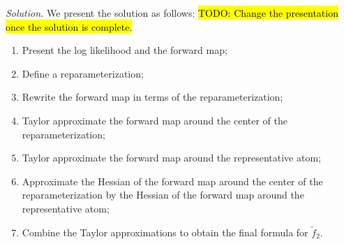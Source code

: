 \documentclass{homework}
\begin{document}
\textit{Solution.} 
We present the solution as follows: \hl{TODO: Change the presentation once the solution is complete.}
\begin{enumerate}
    \item Present the log likelihood and the forward map;
    \item Define a reparameterization;
    \item Rewrite the forward map in terms of the reparameterization;
    \item Taylor approximate the forward map around the center of the reparameterization;
    \item Taylor approximate the forward map around the representative atom;
    \item Approximate the Hessian of the forward map around the center of the reparameterization by the Hessian of the forward map around the representative atom;
    \item Combine the Taylor approximations to obtain the final formula for $\tilde{f}_2$.
\end{enumerate}
\end{document}
